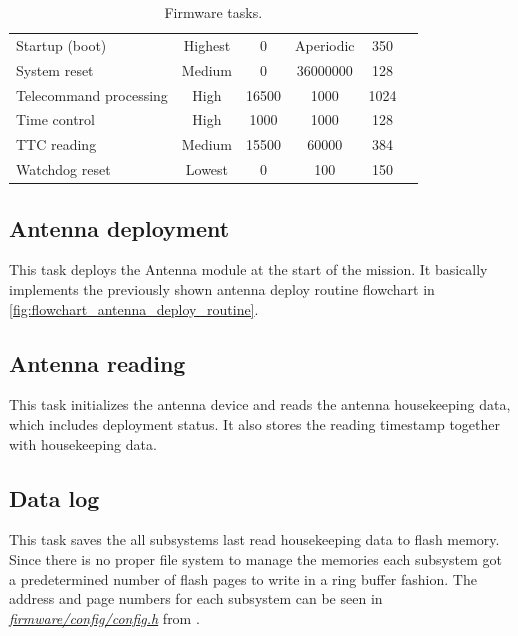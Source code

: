 \begin{table}[!t]
\begin{tabular}{lccccc}
		Startup (boot)         & Highest           & 0                           & Aperiodic            & 350                    \\
		System reset           & Medium            & 0                           & 36000000             & 128                    \\
		Telecommand processing & High              & 16500                       & 1000                 & 1024                   \\
		Time control           & High              & 1000                        & 1000                 & 128                    \\
		TTC reading            & Medium            & 15500                       & 60000                & 384                    \\
		Watchdog reset         & Lowest            & 0                           & 100                  & 150                    \\
		\bottomrule[1.5pt]
	\end{tabular}
	\caption{Firmware tasks.}
	\label{tab:firmware-tasks}
\end{table}

\subsection{Antenna deployment}

This task deploys the Antenna module at the start of the mission. It basically implements the previously shown antenna deploy routine flowchart in \autoref{fig:flowchart_antenna_deploy_routine}.

\subsection{Antenna reading}

This task initializes the antenna device and reads the antenna housekeeping data, which includes deployment status. It also stores the reading timestamp together with housekeeping data.

\subsection{Data log} \label{sec:data-log-task}

This task saves the all subsystems last read housekeeping data to flash memory. Since there is no proper file system to manage the memories each subsystem got a predetermined number of flash pages to write in a ring buffer fashion. The address and page numbers for each subsystem can be seen in \textit{\href{https://github.com/spacelab-ufsc/obdh2/blob/master/firmware/config/config.h}{firmware/config/config.h}} from \cite{obdh2-repo}.

